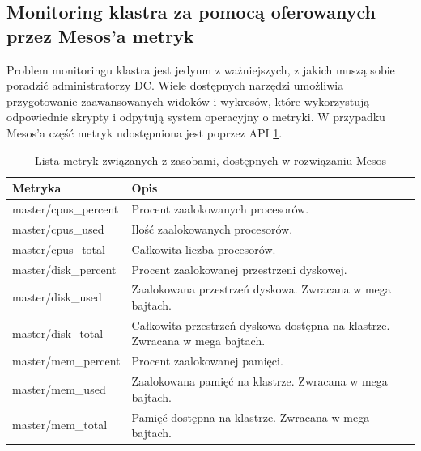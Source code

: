 \documentclass[10pt,a4paper,titlepage,twoside]{report}
\begin{document}
\subsection{Monitoring klastra za pomocą oferowanych przez Mesos'a metryk}
Problem monitoringu klastra jest jedynm z ważniejszych, z jakich muszą sobie poradzić administratorzy DC. Wiele dostępnych narzędzi umożliwia przygotowanie zaawansowanych widoków i wykresów, które wykorzystują odpowiednie skrypty i odpytują system operacyjny o metryki. W przypadku Mesos'a część metryk udostępniona jest poprzez API \ref{mesos_metrics}.

\begin{table}[!htbp]
\caption{Lista metryk związanych z zasobami, dostępnych w rozwiązaniu Mesos}
\label{mesos_metrics}
\centering
\begin{tabular}{|p{4cm}|p{10cm}|}
  \hline
  \textbf{Metryka} & \textbf{Opis} \\
  \hline
  master/cpus\_percent & Procent zaalokowanych procesorów.\\
  \hline
  master/cpus\_used & Ilość zaalokowanych procesorów. \\
  \hline
  master/cpus\_total & Całkowita liczba procesorów. \\
  \hline
  master/disk\_percent & Procent zaalokowanej przestrzeni dyskowej. \\
  \hline
  master/disk\_used & Zaalokowana przestrzeń dyskowa. Zwracana w mega bajtach. \\
  \hline
  master/disk\_total & Całkowita przestrzeń dyskowa dostępna na klastrze. Zwracana w mega bajtach. \\
  \hline
  master/mem\_percent & Procent zaalokowanej pamięci. \\
  \hline
  master/mem\_used & Zaalokowana pamięć na klastrze. Zwracana w mega bajtach. \\
  \hline
  master/mem\_total & Pamięć dostępna na klastrze. Zwracana w mega bajtach. \\
  \hline
\end{tabular}
\end{table}
\end{document}
